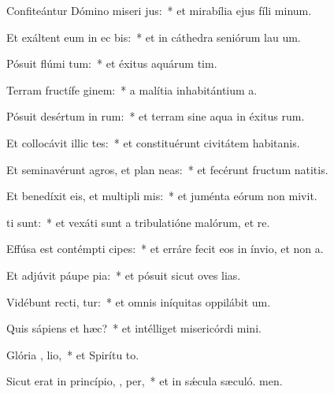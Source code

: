 \item Confiteántur Dómino miseri jus:~* et mirabília ejus fíli minum.
\item Et exáltent eum in ec bis:~* et in cáthedra seniórum lau um.
\item Pósuit flúmi  tum:~* et éxitus aquárum  tim.
\item Terram fructífe  ginem:~* a malítia inhabitántium  a.
\item Pósuit desértum in  rum:~* et terram sine aqua in éxitus rum.
\item Et collocávit illic tes:~* et constituérunt civitátem habitanis.
\item Et seminavérunt agros, et plan neas:~* et fecérunt fructum natitis.
\item Et benedíxit eis, et multipli  mis:~* et juménta eórum non mivit.
\item {}  ti sunt:~* et vexáti sunt a tribulatióne malórum, et re.
\item Effúsa est contémpti  cipes:~* et erráre fecit eos in ínvio, et non  a.
\item Et adjúvit páupe  pia:~* et pósuit sicut oves lias.
\item Vidébunt recti,  tur:~* et omnis iníquitas oppilábit  um.
\item Quis sápiens et  hæc?~* et intélliget misericórdi mini.
\item Glória ,  lio,~* et Spirítu to.
\item Sicut erat in princípio,  ,  per,~* et in sǽcula sæculó. men.
